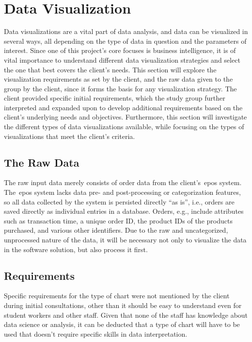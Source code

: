 \section{Data Visualization}\label{sec:data-visualization}

Data visualizations are a vital part of data analysis, and data can be visualized in several ways, all depending on the
type of data in question and the parameters of interest.
Since one of this project's core focuses is business intelligence, it is of vital importance to understand different
data visualization strategies and select the one that best covers the client's needs.
This section will explore the visualization requirements as set by the client, and the raw data given to the group by
the client, since it forms the basis for any visualization strategy.
The client provided specific initial requirements, which the study group further interpreted and expanded upon to
develop additional requirements based on the client's underlying needs and objectives.
Furthermore, this section will investigate the different types of data visualizations available, while focusing on the
types of visualizations that meet the client's criteria.

\subsection{The Raw Data}\label{subsec:the-client's-raw-data}
The raw input data merely consists of order data from the client's~\acrfull{epos} system.
The~\acrshort{epos} system lacks data pre- and post-processing or categorization features, so all data collected by the
system is persisted directly ``as is'', i.e., orders are saved directly as individual entries in a database.
Orders, e.g., include attributes such as transaction time, a unique order ID, the product IDs of the products purchased,
and various other identifiers.
Due to the raw and uncategorized, unprocessed nature of the data, it will be necessary not only to visualize the data in
the software solution, but also process it first.

\subsection{Requirements}\label{subsec:requirements}
Specific requirements for the type of chart were not mentioned by the client during initial consultations, other than it
should be easy to understand even for student workers and other staff.
Given that none of the staff has knowledge about data science or analysis, it can be deducted that a type of chart will
have to be used that doesn't require specific skills in data interpretation.

